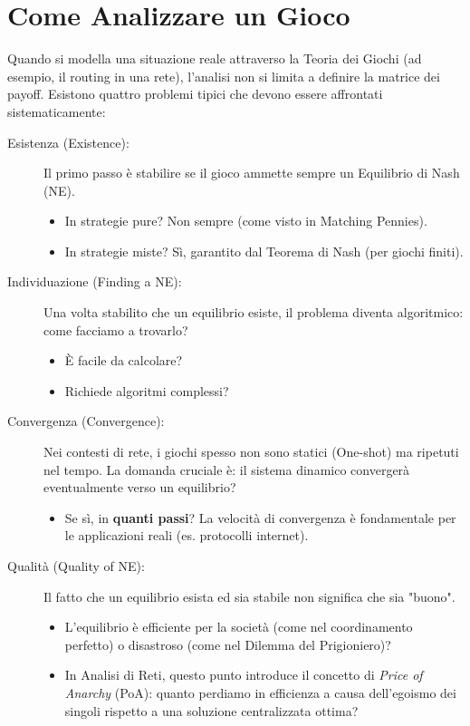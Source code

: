 \section{Come Analizzare un Gioco}

Quando si modella una situazione reale attraverso la Teoria dei Giochi (ad esempio, il routing in una rete), l'analisi non si limita a definire la matrice dei payoff. Esistono quattro problemi tipici che devono essere affrontati sistematicamente:

\begin{description}
    \item[Esistenza (Existence):]
    Il primo passo è stabilire se il gioco ammette sempre un Equilibrio di Nash (NE).
    \begin{itemize}
        \item In strategie pure? Non sempre (come visto in Matching Pennies).
        \item In strategie miste? Sì, garantito dal Teorema di Nash (per giochi finiti).
    \end{itemize}

    \item[Individuazione (Finding a NE):]
    Una volta stabilito che un equilibrio esiste, il problema diventa algoritmico: come facciamo a trovarlo?
    \begin{itemize}
        \item È facile da calcolare?
        \item Richiede algoritmi complessi?
    \end{itemize}

    \item[Convergenza (Convergence):]
    Nei contesti di rete, i giochi spesso non sono statici (One-shot) ma ripetuti nel tempo. La domanda cruciale è: il sistema dinamico convergerà eventualmente verso un equilibrio?
    \begin{itemize}
        \item Se sì, in \textbf{quanti passi}? La velocità di convergenza è fondamentale per le applicazioni reali (es. protocolli internet).
    \end{itemize}

    \item[Qualità (Quality of NE):]
    Il fatto che un equilibrio esista ed sia stabile non significa che sia "buono".
    \begin{itemize}
        \item L'equilibrio è efficiente per la società (come nel coordinamento perfetto) o disastroso (come nel Dilemma del Prigioniero)?
        \item In Analisi di Reti, questo punto introduce il concetto di \textit{Price of Anarchy} (PoA): quanto perdiamo in efficienza a causa dell'egoismo dei singoli rispetto a una soluzione centralizzata ottima?
    \end{itemize}
\end{description}

